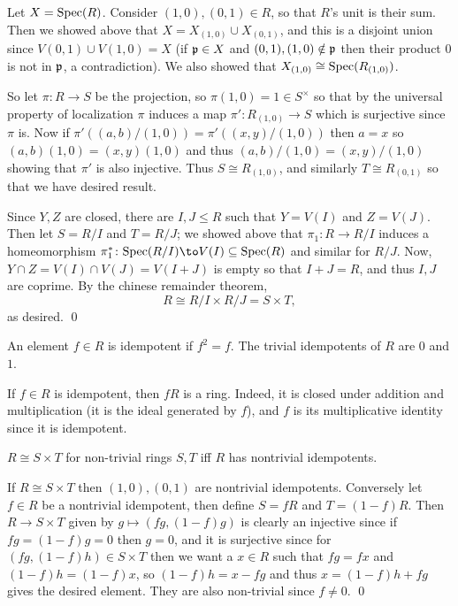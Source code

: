\eprop

\bproof

    Let $X={\rm Spec}(R)$.
    Consider $(1,0),(0,1)\in R$, so that $R$'s unit is their sum.
    Then we showed above that $X=X_{(1,0)}\cup X_{(0,1)}$, and this is a disjoint union since $V(0,1)\cup V(1,0)=X$ (if ${{\frak p}}\in X$ and $(0,1),(1,0)\notin{{\frak p}}$ then their product $0$ is not in
    ${{\frak p}}$, a contradiction).
    We also showed that $X_{(1,0)}\cong{\rm Spec}(R_{(1,0)})$.

    So let $\pi\colon R\to S$ be the projection, so $\pi(1,0)=1\in S^\times$ so that by the universal property of localization $\pi$ induces a map $\pi'\colon R_{(1,0)}\to S$ which is
    surjective since $\pi$ is.
    Now if $\pi'((a,b)/(1,0))=\pi'((x,y)/(1,0))$ then $a=x$ so $(a,b)(1,0)=(x,y)(1,0)$ and thus $(a,b)/(1,0)=(x,y)/(1,0)$ showing that $\pi'$ is also injective.
    Thus $S\cong R_{(1,0)}$, and similarly $T\cong R_{(0,1)}$ so that we have desired result.

    Since $Y,Z$ are closed, there are $I,J\leq R$ such that $Y=V(I)$ and $Z=V(J)$.
    Then let $S=R/I$ and $T=R/J$; we showed above that $\pi_1\colon R\to R/I$ induces a homeomorphism $\pi_1^*\colon\spec(R/I)\to V(I)\subseteq\spec(R)$ and similar for $R/J$.
    Now, $Y\cap Z=V(I)\cap V(J)=V(I+J)$ is empty so that $I+J=R$, and thus $I,J$ are coprime.
    By the chinese remainder theorem,
    $$ R \cong R/I \times R/J = S\times T, $$
    as desired.
    \qed

\eproof

\bdefn

    An element $f\in R$ is {\emphcolor idempotent} if $f^2=f$.
    The {\emphcolor trivial idempotents} of $R$ are $0$ and $1$.

\edefn

If $f\in R$ is idempotent, then $fR$ is a ring.
Indeed, it is closed under addition and multiplication (it is the ideal generated by $f$), and $f$ is its multiplicative identity since it is idempotent.

\bprop

    $R\cong S\times T$ for non-trivial rings $S,T$ iff $R$ has nontrivial idempotents.

\eprop

\bproof

    If $R\cong S\times T$ then $(1,0),(0,1)$ are nontrivial idempotents.
    Conversely let $f\in R$ be a nontrivial idempotent, then define $S=fR$ and $T=(1-f)R$.
    Then $R\to S\times T$ given by $g\mapsto(fg,(1-f)g)$ is clearly an injective since if $fg=(1-f)g=0$ then $g=0$, and it is surjective since for $(fg,(1-f)h)\in S\times T$ then we want a $x\in R$ such that
    $fg=fx$ and $(1-f)h=(1-f)x$, so $(1-f)h=x-fg$ and thus $x=(1-f)h+fg$ gives the desired element.
    They are also non-trivial since $f\neq0$.
    \qed

